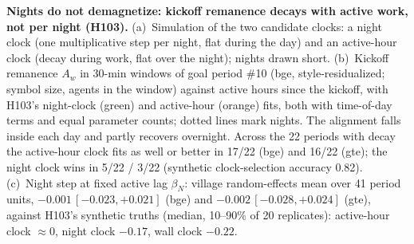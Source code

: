\caption{\textbf{Nights do not demagnetize: kickoff remanence decays with active work, not per night (H103).}
(a)~Simulation of the two candidate clocks: a night clock (one multiplicative step per night, flat during the day) and an active-hour clock (decay during work, flat over the night); nights drawn short.
(b)~Kickoff remanence $A_w$ in 30-min windows of goal period \#10 (bge, style-residualized; symbol size, agents in the window) against active hours since the kickoff, with H103's night-clock (green) and active-hour (orange) fits, both with time-of-day terms and equal parameter counts; dotted lines mark nights. The alignment falls inside each day and partly recovers overnight. Across the 22 periods with decay the active-hour clock fits as well or better in 17/22 (bge) and 16/22 (gte); the night clock wins in 5/22 / 3/22 (synthetic clock-selection accuracy 0.82).
(c)~Night step at fixed active lag $\beta_N$: village random-effects mean over 41 period units, $-0.001\,[-0.023,+0.021]$ (bge) and $-0.002\,[-0.028,+0.024]$ (gte), against H103's synthetic truths (median, 10--90\% of 20 replicates): active-hour clock $\approx0$, night clock $-0.17$, wall clock $-0.22$.}
\label{fig:H103}
